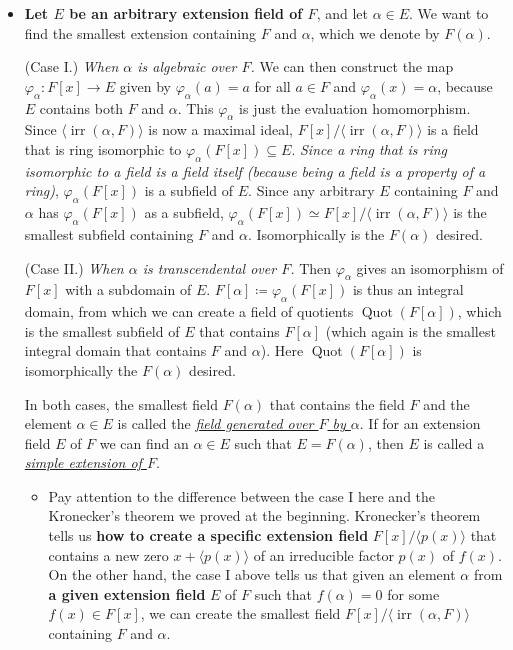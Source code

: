 \documentclass[11pt]{article}
\newcommand{\df}[1]{\ul{\textit{\textsf{#1}}}}
\newcommand{\la}{\langle}
\newcommand{\ra}{\rangle}
\newcommand{\gen}[1]{\langle #1 \rangle}
\newcommand{\Quot}{\operatorname{Quot}} %
\newcommand{\irr}{\operatorname{irr}}
\renewcommand{\phi}{\varphi}
\begin{document}
\begin{itemize}
    \item \textbf{Let $E$ be an arbitrary extension field of $F$}, and let $\alpha \in E$. We want to find the smallest extension containing $F$ and $\alpha$, which we denote by $F(\alpha)$.
    
    (Case I.) \emph{When $\alpha$ is algebraic over $F$.} We can then construct the map $\phi_\alpha: F[x] \to E$ given by $\phi_\alpha(a) = a$ for all $a \in F$ and $\phi_\alpha(x) = \alpha$, because $E$ contains both $F$ and $\alpha$. This $\phi_\alpha$ is just the evaluation homomorphism. Since $\gen{\irr(\alpha,F)}$ is now a maximal ideal, $F[x]/\gen{\irr(\alpha,F)}$ is a field that is ring isomorphic to $\phi_\alpha(F[x]) \subseteq E$. \emph{Since a ring that is ring isomorphic to a field is a field itself (because being a field is a \emph{property} of a ring)}, $\phi_\alpha(F[x])$ is a subfield of $E$. Since any arbitrary $E$ containing $F$ and $\alpha$ has $\phi_\alpha(F[x])$ as a subfield, $\phi_\alpha(F[x]) \simeq F[x]/\la \irr(\alpha,F) \ra$ is the smallest subfield containing $F$ and $\alpha$. Isomorphically is the $F(\alpha)$ desired.
    
    (Case II.) \emph{When $\alpha$ is transcendental over $F$.} Then $\phi_\alpha$ gives an isomorphism of $F[x]$ with a subdomain of $E$. $F[\alpha] \coloneqq \phi_\alpha(F[x])$ is thus an integral domain, from which we can create a field of quotients $\Quot(F[\alpha])$, which is the smallest subfield of $E$ that contains $F[\alpha]$ (which again is the smallest integral domain that contains $F$ and $\alpha$). Here $\Quot(F[\alpha])$ is isomorphically the $F(\alpha)$ desired.
    
    In both cases, the smallest field $F(\alpha)$ that contains the field $F$ and the element $\alpha \in E$ is called the \df{field generated over $F$ by $\alpha$}. If for an extension field $E$ of $F$ we can find an $\alpha \in E$ such that $E = F(\alpha)$, then $E$ is called a \df{simple extension of $F$}.
    \begin{itemize}
        \item Pay attention to the difference between the case I here and the Kronecker's theorem we proved at the beginning. Kronecker's theorem tells us \textbf{how to create a specific extension field} $F[x]/\la p(x) \ra$ that contains a new zero $x + \la p(x) \ra$ of an irreducible factor $p(x)$ of $f(x)$. On the other hand, the case I above tells us that given an element $\alpha$ from \textbf{a given extension field} $E$ of $F$ such that $f(\alpha) = 0$ for some $f(x) \in F[x]$, we can create the smallest field $F[x]/\la \irr(\alpha,F) \ra$ containing $F$ and $\alpha$.
        

\end{itemize}
\end{itemize}
\end{document}
